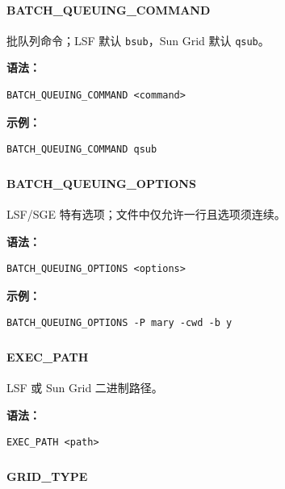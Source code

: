 \paragraph*{BATCH_QUEUING_COMMAND}

批队列命令；LSF 默认 \texttt{bsub}，Sun Grid 默认 \texttt{qsub}。

\textbf{语法：}
\begin{lstlisting}
BATCH_QUEUING_COMMAND <command>
\end{lstlisting}

\textbf{示例：}
\begin{lstlisting}
BATCH_QUEUING_COMMAND qsub
\end{lstlisting}

\subsubsection{}
\paragraph*{BATCH_QUEUING_OPTIONS}

LSF/SGE 特有选项；文件中仅允许一行且选项须连续。

\textbf{语法：}
\begin{lstlisting}
BATCH_QUEUING_OPTIONS <options>
\end{lstlisting}

\textbf{示例：}
\begin{lstlisting}
BATCH_QUEUING_OPTIONS -P mary -cwd -b y
\end{lstlisting}

\subsubsection{}
\paragraph*{EXEC_PATH}

LSF 或 Sun Grid 二进制路径。

\textbf{语法：}
\begin{lstlisting}
EXEC_PATH <path>
\end{lstlisting}

\subsubsection{}
\paragraph*{GRID_TYPE}

